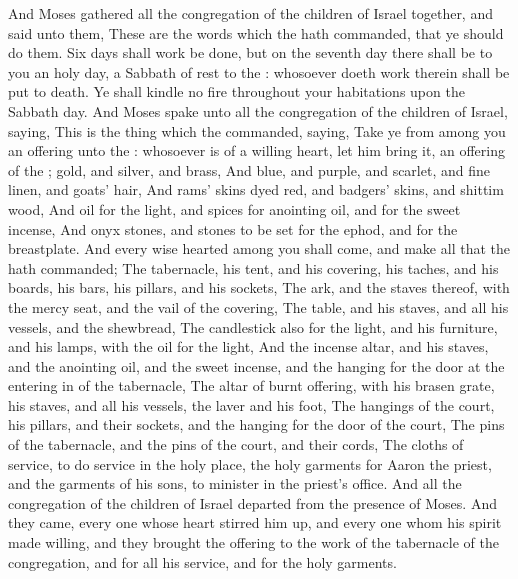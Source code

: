 \begin{biblechapter} %
 And Moses gathered all the congregation of the children of Israel together, and said unto them, These are the words which the \LORD hath commanded, that ye should do them.
\verse Six days shall work be done, but on the seventh day there shall be to you an holy day, a Sabbath of rest to the \LORD: whosoever doeth work therein shall be put to death.
\verse Ye shall kindle no fire throughout your habitations upon the Sabbath day.
 And Moses spake unto all the congregation of the children of Israel, saying, This is the thing which the \LORD commanded, saying,
\verse Take ye from among you an offering unto the \LORD: whosoever is of a willing heart, let him bring it, an offering of the \LORD; gold, and silver, and brass,
\verse And blue, and purple, and scarlet, and fine linen, and goats' hair,
\verse And rams' skins dyed red, and badgers' skins, and shittim wood,
\verse And oil for the light, and spices for anointing oil, and for the sweet incense,
\verse And onyx stones, and stones to be set for the ephod, and for the breastplate.
\verse And every wise hearted among you shall come, and make all that the \LORD hath commanded;
\verse The tabernacle, his tent, and his covering, his taches, and his boards, his bars, his pillars, and his sockets,
\verse The ark, and the staves thereof, with the mercy seat, and the vail of the covering,
\verse The table, and his staves, and all his vessels, and the shewbread,
\verse The candlestick also for the light, and his furniture, and his lamps, with the oil for the light,
\verse And the incense altar, and his staves, and the anointing oil, and the sweet incense, and the hanging for the door at the entering in of the tabernacle,
\verse The altar of burnt offering, with his brasen grate, his staves, and all his vessels, the laver and his foot,
\verse The hangings of the court, his pillars, and their sockets, and the hanging for the door of the court,
\verse The pins of the tabernacle, and the pins of the court, and their cords,
\verse The cloths of service, to do service in the holy place, the holy garments for Aaron the priest, and the garments of his sons, to minister in the priest's office.
\verse And all the congregation of the children of Israel departed from the presence of Moses.
\verse And they came, every one whose heart stirred him up, and every one whom his spirit made willing, and they brought the \LORDs offering to the work of the tabernacle of the congregation, and for all his service, and for the holy garments.

\end{biblechapter}
